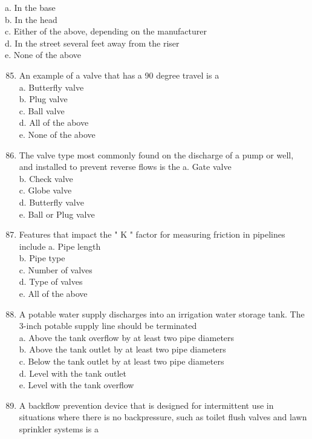 \documentclass[10pt]{article}
\begin{document}
\begin{enumerate}
\begin{enumerate}
a. In the base\\
b. In the head\\
c. Either of the above, depending on the manufacturer\\
d. In the street several feet away from the riser\\
e. None of the above\\

\begin{enumerate}
  \setcounter{enumi}{84}
  \item An example of a valve that has a 90 degree travel is a\\
a. Butterfly valve\\
b. Plug valve\\
c. Ball valve\\
d. All of the above\\
e. None of the above

  \item The valve type most commonly found on the discharge of a pump or well, and installed to prevent reverse flows is the
a. Gate valve\\
b. Check valve\\
c. Globe valve\\
d. Butterfly valve\\
e. Ball or Plug valve\\

  \item Features that impact the " $\mathrm{K}$ " factor for measuring friction in pipelines include
a. Pipe length\\
b. Pipe type\\
c. Number of valves\\
d. Type of valves\\
e. All of the above

  \item A potable water supply discharges into an irrigation water storage tank. The 3-inch potable supply line should be terminated\\
a. Above the tank overflow by at least two pipe diameters\\
b. Above the tank outlet by at least two pipe diameters\\
c. Below the tank outlet by at least two pipe diameters\\
d. Level with the tank outlet\\
e. Level with the tank overflow\\

  \item A backflow prevention device that is designed for intermittent use in situations where there is no backpressure, such as toilet flush valves and lawn sprinkler systems is a


\end{enumerate}
\end{enumerate}
\end{enumerate}
\end{document}
